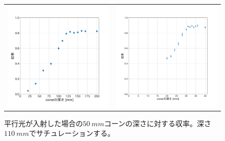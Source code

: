 \begin{figure}[htbp]
  \begin{tabular}{cc}
    \begin{minipage}[t]{0.45\hsize}
      \centering
      \includegraphics[keepaspectratio, scale=0.3]{images/chapter3/cone50_optimize.pdf}
      \caption{平行光が入射した場合の$\SI{50}{mm}$コーンの深さに対する収率。深さ$\SI{110}{mm}$でサチュレーションする。}
      \label{fig:cone50_optimize}
    \end{minipage} &
    \begin{minipage}[t]{0.45\hsize}
      \centering
      \includegraphics[keepaspectratio, scale=0.3]{images/chapter3/cone30_optimize.pdf}

\end{minipage}
\end{tabular}
\end{figure}
